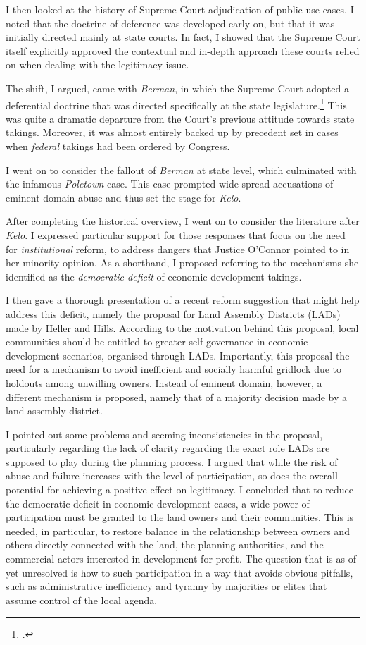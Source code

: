 {I then looked at the history of Supreme Court adjudication of public use cases. I noted that the doctrine of deference was developed early on, but that it was initially directed mainly at state courts. In fact, I showed that the Supreme Court itself explicitly approved the contextual and in-depth approach these courts relied on when dealing with the legitimacy issue.

The shift, I argued, came with {\it Berman}, in which the Supreme Court adopted a deferential doctrine that was directed specifically at the state legislature.\footcite{berman54} This was quite a dramatic departure from the Court's previous attitude towards state takings. Moreover, it was almost entirely backed up by precedent set in cases when {\it federal} takings had been ordered by Congress.

I went on to consider the fallout of {\it Berman} at state level, which culminated with the infamous {\it Poletown} case. This case prompted wide-spread accusations of eminent domain abuse and thus set the stage for {\it Kelo}.

After completing the historical overview, I went on to consider the literature after {\it Kelo}. I expressed particular support for those responses that focus on the need for {\it institutional} reform, to address  dangers that Justice O'Connor pointed to in her minority opinion. As a shorthand, I proposed referring to the mechanisms she identified as the {\it democratic deficit} of economic development takings. 

I then gave a thorough presentation of a recent reform suggestion that might help address this deficit, namely the proposal for Land Assembly Districts (LADs) made by Heller and Hills. According to the motivation behind this proposal, local communities should be entitled to greater self-governance in economic development scenarios, organised through LADs. Importantly, this proposal  the need for a mechanism to avoid inefficient and socially harmful gridlock due to holdouts among unwilling owners. Instead of eminent domain, however, a different mechanism is proposed, namely that of a majority decision made by a land assembly district.

I pointed out some problems and seeming inconsistencies in the proposal, particularly regarding the lack of clarity regarding the exact role LADs are supposed to play during the planning process. I argued that while the risk of abuse and failure increases with the level of participation, so does the overall potential for achieving a positive effect on legitimacy. I concluded that to reduce the democratic deficit in economic development cases, a wide power of participation must be granted to the land owners and their communities. This is needed, in particular, to restore balance in the relationship between owners and others directly connected with the land, the planning authorities, and the commercial actors interested in development for profit. The question that is as of yet unresolved is how to  such participation in a way that avoids obvious pitfalls, such as administrative inefficiency and tyranny by majorities or elites that assume control of the local agenda.

}
